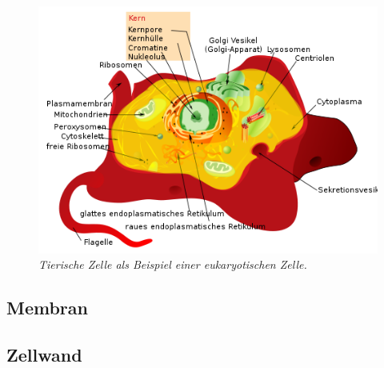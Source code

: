 	\begin{figure}[ht!]
	\leavevmode
	\begin{center}
	\includegraphics[scale=0.47]{./pictures/animal_cell_500}
	\end{center}
	\caption{\slshape{Tierische Zelle als Beispiel einer eukaryotischen Zelle.}}
	\label{fig:eukarya}
	\end{figure}


\subsection{Membran}

\subsection{Zellwand}
